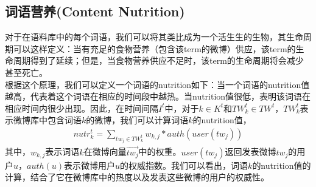\documentclass[a4paper]{article}
\begin{document}
\subsection{词语营养(Content Nutrition)}
对于在语料库中的每个词语，我们可以将其类比成为一个活生生的生物，其生命周期可以这样定义：当有充足的食物营养（包含该term的微博）供应，该term的生命周期得到了延续；但是，当食物营养供应不足时，该term的生命周期将会减少甚至死亡。\\
\indent 根据这个原理，我们可以定义一个词语的nutrition如下：当一个词语的nutrition值越高，代表着这个词语在相应的时间段中越热。当nutrition值很低，表明该词语在相应时间内很少出现。因此，在时间间隔$I^t$中，对于$k\in K^t$和$TW_k^t\in TW^t$，$TW_k^t$表示微博库中包含词语$k$的微博，我们可以计算词语$k$的nutrition值，
\begin{align}
    nutr_k^t=\sum_{tw_j\in TW_k^t} w_{k,j}*auth(user(tw_j))
\end{align}
其中，$w_{k,j}$表示词语$k$在微博向量$\vec{tw_j}$中的权重。$user(tw_j)$返回发表微博$tw_j$的用户$u$，$auth(u)$表示微博用户$u$的权威指数。我们可以看出，词语$k$的nutrition值的计算，结合了它在微博库中的热度以及发表这些微博的用户的权威性。
\end{document}
